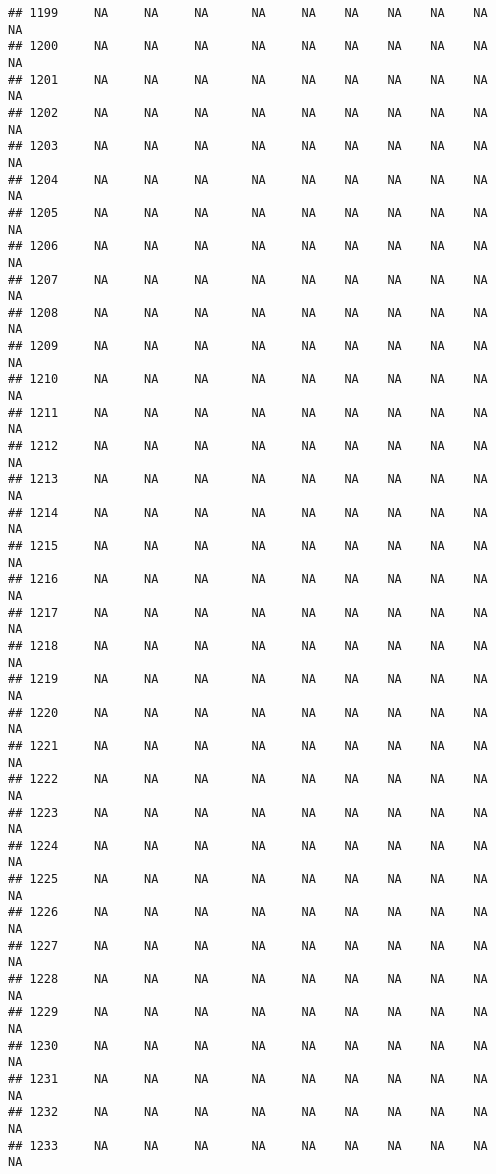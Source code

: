 \documentclass{article}\usepackage{graphicx, color}
\makeatletter
\newenvironment{kframe}{%
 \def\at@end@of@kframe{}%
 \ifinner\ifhmode%
  \def\at@end@of@kframe{\end{minipage}}%
  \begin{minipage}{\columnwidth}%
 \fi\fi%
 \def\FrameCommand##1{\hskip\@totalleftmargin \hskip-\fboxsep
 \colorbox{shadecolor}{##1}\hskip-\fboxsep
     \hskip-\linewidth \hskip-\@totalleftmargin \hskip\columnwidth}%
 \MakeFramed {\advance\hsize-\width
   \@totalleftmargin\z@ \linewidth\hsize
   \@setminipage}}%
 {\par\unskip\endMakeFramed%
 \at@end@of@kframe}
\newenvironment{knitrout}{}{} %
\makeatother
\begin{document}
\begin{knitrout}
\begin{kframe}
\begin{verbatim}
## 1199     NA     NA     NA      NA     NA    NA    NA    NA    NA     NA
## 1200     NA     NA     NA      NA     NA    NA    NA    NA    NA     NA
## 1201     NA     NA     NA      NA     NA    NA    NA    NA    NA     NA
## 1202     NA     NA     NA      NA     NA    NA    NA    NA    NA     NA
## 1203     NA     NA     NA      NA     NA    NA    NA    NA    NA     NA
## 1204     NA     NA     NA      NA     NA    NA    NA    NA    NA     NA
## 1205     NA     NA     NA      NA     NA    NA    NA    NA    NA     NA
## 1206     NA     NA     NA      NA     NA    NA    NA    NA    NA     NA
## 1207     NA     NA     NA      NA     NA    NA    NA    NA    NA     NA
## 1208     NA     NA     NA      NA     NA    NA    NA    NA    NA     NA
## 1209     NA     NA     NA      NA     NA    NA    NA    NA    NA     NA
## 1210     NA     NA     NA      NA     NA    NA    NA    NA    NA     NA
## 1211     NA     NA     NA      NA     NA    NA    NA    NA    NA     NA
## 1212     NA     NA     NA      NA     NA    NA    NA    NA    NA     NA
## 1213     NA     NA     NA      NA     NA    NA    NA    NA    NA     NA
## 1214     NA     NA     NA      NA     NA    NA    NA    NA    NA     NA
## 1215     NA     NA     NA      NA     NA    NA    NA    NA    NA     NA
## 1216     NA     NA     NA      NA     NA    NA    NA    NA    NA     NA
## 1217     NA     NA     NA      NA     NA    NA    NA    NA    NA     NA
## 1218     NA     NA     NA      NA     NA    NA    NA    NA    NA     NA
## 1219     NA     NA     NA      NA     NA    NA    NA    NA    NA     NA
## 1220     NA     NA     NA      NA     NA    NA    NA    NA    NA     NA
## 1221     NA     NA     NA      NA     NA    NA    NA    NA    NA     NA
## 1222     NA     NA     NA      NA     NA    NA    NA    NA    NA     NA
## 1223     NA     NA     NA      NA     NA    NA    NA    NA    NA     NA
## 1224     NA     NA     NA      NA     NA    NA    NA    NA    NA     NA
## 1225     NA     NA     NA      NA     NA    NA    NA    NA    NA     NA
## 1226     NA     NA     NA      NA     NA    NA    NA    NA    NA     NA
## 1227     NA     NA     NA      NA     NA    NA    NA    NA    NA     NA
## 1228     NA     NA     NA      NA     NA    NA    NA    NA    NA     NA
## 1229     NA     NA     NA      NA     NA    NA    NA    NA    NA     NA
## 1230     NA     NA     NA      NA     NA    NA    NA    NA    NA     NA
## 1231     NA     NA     NA      NA     NA    NA    NA    NA    NA     NA
## 1232     NA     NA     NA      NA     NA    NA    NA    NA    NA     NA
## 1233     NA     NA     NA      NA     NA    NA    NA    NA    NA     NA

\end{verbatim}
\end{kframe}
\end{knitrout}
\end{document}

